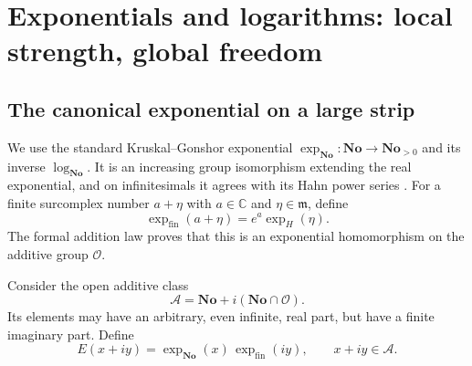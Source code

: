 \documentclass[11pt,a4paper]{article}
\numberwithin{equation}{section}
\theoremstyle{definition}
\newcommand{\No}{\mathbf{No}}
\newcommand{\C}{\mathbb C}
\newcommand{\OO}{\mathcal O}
\newcommand{\mm}{\mathfrak m}
\newcommand{\fin}{\mathrm{fin}}
\begin{document}
\section{Exponentials and logarithms: local strength, global freedom}

\subsection{The canonical exponential on a large strip}

We use the standard Kruskal--Gonshor exponential
$\exp_{\No}:\No\to\No_{>0}$ and its inverse $\log_{\No}$. It is an increasing
group isomorphism extending the real exponential, and on infinitesimals it
agrees with its Hahn power series \cite{Gonshor,BMder}.
For a finite surcomplex number $a+\eta$ with $a\in\C$ and $\eta\in\mm$, define
\[
 \exp_{\fin}(a+\eta)=e^a\exp_H(\eta).
\]
The formal addition law proves that this is an exponential homomorphism on
the additive group $\OO$.

Consider the open additive class
\[
 \mathcal A=\No+i(\No\cap\OO).
\]
Its elements may have an arbitrary, even infinite, real part, but have a
finite imaginary part. Define
\begin{equation}\label{eq:strip-exp}
 E(x+iy)=\exp_{\No}(x)\,\exp_{\fin}(iy),\qquad x+iy\in\mathcal A.
\end{equation}
\end{document}
